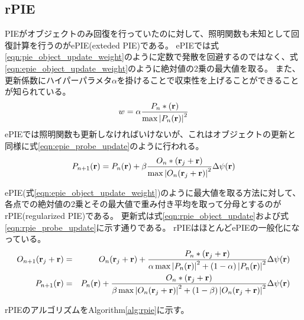\subsection{rPIE}
PIEがオブジェクトのみ回復を行っていたのに対して、照明関数も未知として回復計算を行うのがePIE(exteded PIE)である。
ePIEでは式\ref{eqn:pie_object_update_weight}のように定数で発散を回避するのではなく、式\ref{eqn:epie_object_update_weight}のように絶対値の2乗の最大値を取る。
また、更新係数にハイパーパラメタ$\alpha$を掛けることで収束性を上げることができることが知られている。
\begin{equation}
  \label{eqn:epie_object_update_weight}
  w = \alpha \frac{P_n*(\mathbf{r})}{\max \left| P_n(\mathbf{r}) \right|^2}
\end{equation}
ePIEでは照明関数も更新しなければいけないが、これはオブジェクトの更新と同様に式\ref{eqn:epie_probe_update}のように行われる。
\begin{equation}
\label{eqn:epie_probe_update}
  P_{n+1}(\mathbf{r}) 
  = P_n(\mathbf{r}) 
  + \beta \frac{O_n*(\mathbf{r}_j + \mathbf{r})}{\max \left| O_n(\mathbf{r}_j + \mathbf{r}) \right|^2} \Delta\psi(\mathbf{r})
\end{equation}

ePIE(式\ref{eqn:epie_object_update_weight})のように最大値を取る方法に対して、各点での絶対値の2乗とその最大値で重み付き平均を取って分母とするのがrPIE(regularized PIE)である。
更新式は式\ref{eqn:rpie_object_update}および式\ref{eqn:rpie_probe_update}に示す通りである。
rPIEはほとんどePIEの一般化になっている。
\begin{eqnarray}
  O_{n+1}(\mathbf{r}_j + \mathbf{r}) &=& O_n(\mathbf{r}_j + \mathbf{r}) 
    + \frac{P_n*(\mathbf{r}_j + \mathbf{r})}
      {\alpha \max \left| P_n(\mathbf{r}) \right|^2 + (1-\alpha) \left| P_n(\mathbf{r}) \right|^2}
    \Delta\psi(\mathbf{r}) \label{eqn:rpie_object_update} \\
  P_{n+1}(\mathbf{r}) &=& P_n(\mathbf{r}) 
    + \frac{O_n*(\mathbf{r}_j + \mathbf{r})}
      {\beta \max \left| O_n(\mathbf{r}_j + \mathbf{r}) \right|^2 + (1-\beta) \left| O_n(\mathbf{r}_j + \mathbf{r}) \right|^2}
    \Delta\psi(\mathbf{r}) \label{eqn:rpie_probe_update}
\end{eqnarray}

rPIEのアルゴリズムをAlgorithm\ref{alg:rpie}に示す。

